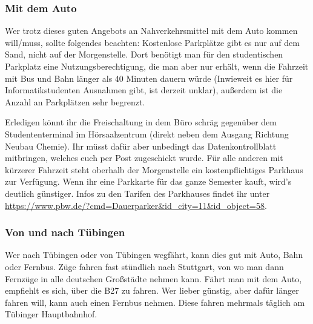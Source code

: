 \subsubsection*{Mit dem Auto}
Wer trotz dieses guten Angebots an Nahverkehrsmittel mit dem Auto kommen will/muss, sollte folgendes beachten: Kostenlose Parkplätze gibt es nur auf dem Sand, nicht auf der Morgenstelle.  Dort benötigt man für den studentischen Parkplatz eine Nutzungsberechtigung, die man aber nur erhält, wenn die Fahrzeit mit Bus und Bahn länger als 40 Minuten dauern würde (Inwieweit es hier für Informatikstudenten Ausnahmen gibt, ist derzeit unklar), außerdem ist die Anzahl an Parkplätzen sehr begrenzt.

 Erledigen könnt ihr die Freischaltung in dem Büro schräg gegenüber dem Studententerminal im Hörsaalzentrum (direkt neben dem Ausgang Richtung Neubau Chemie). Ihr müsst dafür aber unbedingt das Datenkontrollblatt mitbringen, welches euch per Post zugeschickt wurde. Für alle anderen mit kürzerer Fahrzeit steht oberhalb der Morgenstelle ein kostenpflichtiges Parkhaus zur Verfügung. Wenn ihr eine Parkkarte für das ganze Semester kauft, wird's deutlich günstiger. Infos zu den Tarifen des Parkhauses findet ihr unter \url{https://www.pbw.de/?cmd=Dauerparker&id_city=11&id_object=58}.

\subsubsection*{Von und nach Tübingen}
Wer nach Tübingen oder von Tübingen wegfährt, kann dies gut mit Auto, Bahn oder Fernbus. Züge fahren fast stündlich nach Stuttgart, von wo man dann Fernzüge in alle deutschen Großstädte nehmen kann. Fährt man mit dem Auto, empfiehlt es sich, über die B27 zu fahren. Wer lieber günstig, aber dafür länger fahren will, kann auch einen Fernbus nehmen. Diese fahren mehrmals täglich am Tübinger Hauptbahnhof.
